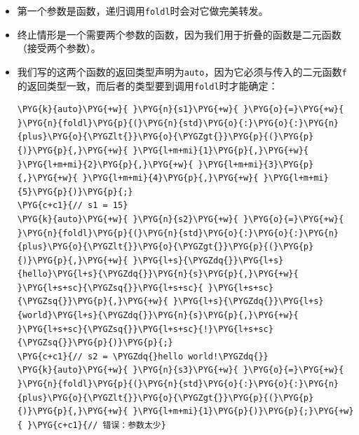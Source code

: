 \begin{itemize}
\item 第一个参数是函数，递归调用\texttt{foldl}时会对它做完美转发。



\item 终止情形是一个需要两个参数的函数，因为我们用于折叠的函数是二元函数（接受两个参数）。



\item 我们写的这两个函数的返回类型声明为\texttt{auto}，因为它必须与传入的二元函数\texttt{f}的返回类型一致，而后者的类型要到调用\texttt{foldl}时才能确定：



\begin{codeblockbg}
\begin{Verbatim}[commandchars=\\\{\},breaklines=true,breakanywhere=true,fontsize=\codefont,xleftmargin=17bp]
\PYG{k}{auto}\PYG{+w}{ }\PYG{n}{s1}\PYG{+w}{ }\PYG{o}{=}\PYG{+w}{ }\PYG{n}{foldl}\PYG{p}{(}\PYG{n}{std}\PYG{o}{:}\PYG{o}{:}\PYG{n}{plus}\PYG{o}{\PYGZlt{}}\PYG{o}{\PYGZgt{}}\PYG{p}{(}\PYG{p}{)}\PYG{p}{,}\PYG{+w}{ }\PYG{l+m+mi}{1}\PYG{p}{,}\PYG{+w}{ }\PYG{l+m+mi}{2}\PYG{p}{,}\PYG{+w}{ }\PYG{l+m+mi}{3}\PYG{p}{,}\PYG{+w}{ }\PYG{l+m+mi}{4}\PYG{p}{,}\PYG{+w}{ }\PYG{l+m+mi}{5}\PYG{p}{)}\PYG{p}{;}
\PYG{c+c1}{// s1 = 15}
\PYG{k}{auto}\PYG{+w}{ }\PYG{n}{s2}\PYG{+w}{ }\PYG{o}{=}\PYG{+w}{ }\PYG{n}{foldl}\PYG{p}{(}\PYG{n}{std}\PYG{o}{:}\PYG{o}{:}\PYG{n}{plus}\PYG{o}{\PYGZlt{}}\PYG{o}{\PYGZgt{}}\PYG{p}{(}\PYG{p}{)}\PYG{p}{,}\PYG{+w}{ }\PYG{l+s}{\PYGZdq{}}\PYG{l+s}{hello}\PYG{l+s}{\PYGZdq{}}\PYG{n}{s}\PYG{p}{,}\PYG{+w}{ }\PYG{l+s+sc}{\PYGZsq{}}\PYG{l+s+sc}{ }\PYG{l+s+sc}{\PYGZsq{}}\PYG{p}{,}\PYG{+w}{ }\PYG{l+s}{\PYGZdq{}}\PYG{l+s}{world}\PYG{l+s}{\PYGZdq{}}\PYG{n}{s}\PYG{p}{,}\PYG{+w}{ }\PYG{l+s+sc}{\PYGZsq{}}\PYG{l+s+sc}{!}\PYG{l+s+sc}{\PYGZsq{}}\PYG{p}{)}\PYG{p}{;}
\PYG{c+c1}{// s2 = \PYGZdq{}hello world!\PYGZdq{}}
\PYG{k}{auto}\PYG{+w}{ }\PYG{n}{s3}\PYG{+w}{ }\PYG{o}{=}\PYG{+w}{ }\PYG{n}{foldl}\PYG{p}{(}\PYG{n}{std}\PYG{o}{:}\PYG{o}{:}\PYG{n}{plus}\PYG{o}{\PYGZlt{}}\PYG{o}{\PYGZgt{}}\PYG{p}{(}\PYG{p}{)}\PYG{p}{,}\PYG{+w}{ }\PYG{l+m+mi}{1}\PYG{p}{)}\PYG{p}{;}\PYG{+w}{ }\PYG{c+c1}{// 错误：参数太少}
\end{Verbatim}
\end{codeblockbg}

\end{itemize}



